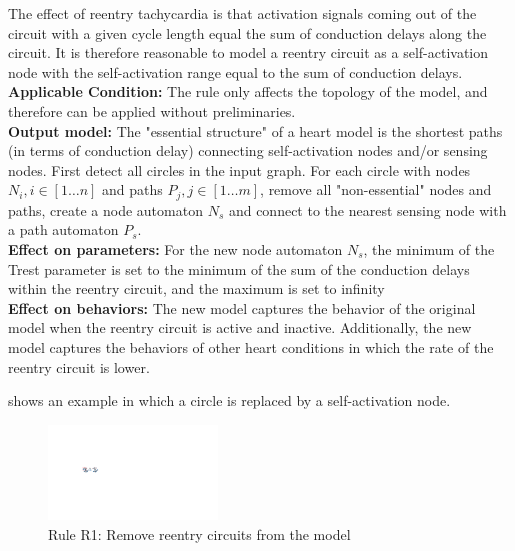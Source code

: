 The effect of reentry tachycardia is that activation signals coming out of the circuit with a given cycle length equal the sum of conduction delays along the circuit.
It is therefore reasonable to model a reentry circuit as a self-activation node with the self-activation range equal to the sum of conduction delays. \\
\textbf{Applicable Condition: } The rule only affects the topology of the model, and therefore can be applied without preliminaries.\\
\textbf{Output model: }The "essential structure" of a heart model is the shortest paths (in terms of conduction delay) connecting self-activation nodes and/or sensing nodes. 
First detect all circles in the input graph. For each circle with nodes $N_i,i\in[1\dots n]$ and paths $P_j,j\in[1\dots m]$, remove all "non-essential" nodes and paths, create a node automaton $N_s$ and connect to the nearest sensing node with a path automaton $P_s$.\\
\textbf{Effect on parameters: }For the new node automaton $N_s$, the minimum of the Trest parameter is set to the minimum of the sum of the conduction delays within the reentry circuit, and the maximum is set to infinity\\
\textbf{Effect on behaviors: }The new model captures the behavior of the original model when the reentry circuit is active and inactive. Additionally, the new model captures the behaviors of other heart conditions in which the rate of the reentry circuit is lower.

 shows an example in which a circle is replaced by a self-activation node.
\begin{figure}[!h]
	\centering
	\includegraphics[width=0.4\textwidth]{figs/rule1.pdf}
	\caption{\small Rule R1: Remove reentry circuits from the model}
	\label{fig:rule1}
\end{figure}
